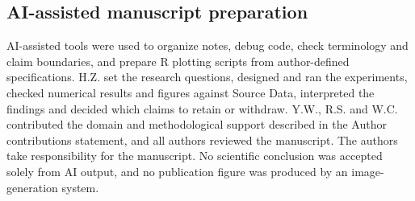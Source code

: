 \documentclass[11pt]{article}
\begin{document}
\subsection*{AI-assisted manuscript preparation}
AI-assisted tools were used to organize notes, debug code, check terminology and claim boundaries, and prepare R plotting scripts from author-defined specifications. H.Z. set the research questions, designed and ran the experiments, checked numerical results and figures against Source Data, interpreted the findings and decided which claims to retain or withdraw. Y.W., R.S. and W.C. contributed the domain and methodological support described in the Author contributions statement, and all authors reviewed the manuscript. The authors take responsibility for the manuscript. No scientific conclusion was accepted solely from AI output, and no publication figure was produced by an image-generation system.
\end{document}
